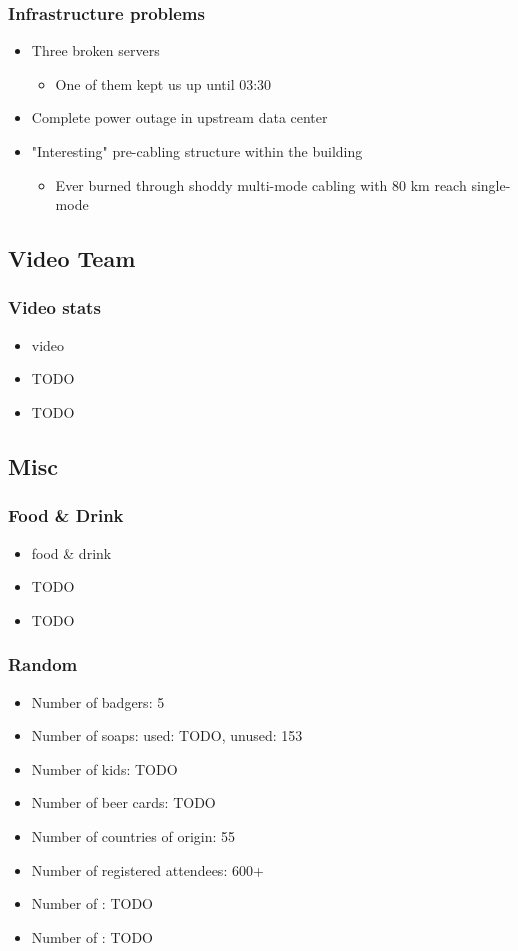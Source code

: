 \documentclass[t]{beamer}
\begin{document}
\begin{frame}
	\frametitle{Infrastructure problems}
	\begin{itemize}
		\item Three broken servers
		\begin{itemize}
			\item One of them kept us up until 03:30
		\end{itemize}
		\item Complete power outage in upstream data center
		\item "Interesting" pre-cabling structure within the building
		\begin{itemize}
			\item Ever burned through shoddy multi-mode cabling with 80 km reach single-mode 
		\end{itemize}
	\end{itemize}
\end{frame}

\subsection{Video Team}

\begin{frame}
	\frametitle{Video stats}
	\begin{itemize}
		\item video
		\item TODO
		\item TODO
	\end{itemize}
\end{frame}

\subsection{Misc}

\begin{frame}
	\frametitle{Food \& Drink}
	\begin{itemize}
		\item food \& drink
		\item TODO
		\item TODO
	\end{itemize}
\end{frame}

\begin{frame}
	\frametitle{Random}
	\begin{itemize}
		\item Number of badgers: 5
		\item Number of soaps: used: TODO, unused: 153
		\item Number of kids: TODO
		\item Number of beer cards: TODO
		\item Number of countries of origin: 55
		\item Number of registered attendees: 600+
		\item Number of : TODO
		\item Number of : TODO
	\end{itemize}
\end{frame}
\end{document}
